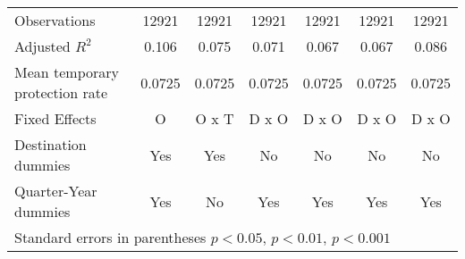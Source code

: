 \begin{table}[!ht]
\begin{tabular}{l*{6}{c}}
\hline
Observations        &       12921         &       12921         &       12921         &       12921         &       12921         &       12921         \\
Adjusted \(R^{2}\)  &       0.106         &       0.075         &       0.071         &       0.067         &       0.067         &       0.086         \\
Mean temporary protection rate&      0.0725         &      0.0725         &      0.0725         &      0.0725         &      0.0725         &      0.0725         \\
Fixed Effects       &           O         &       O x T         &       D x O         &       D x O         &       D x O         &       D x O         \\
Destination dummies &         Yes         &         Yes         &          No         &          No         &          No         &          No         \\
Quarter-Year dummies&         Yes         &          No         &         Yes         &         Yes         &         Yes         &         Yes         \\
\hline\hline
\multicolumn{7}{l}{ Standard errors in parentheses \sym{*} \(p<0.05\), \sym{**} \(p<0.01\), \sym{***} \(p<0.001\)}\\
\end{tabular}
\end{table}
